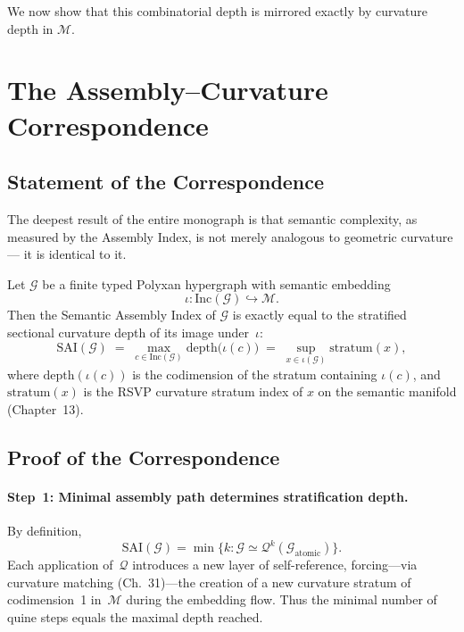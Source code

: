 We now show that this combinatorial depth is mirrored exactly by
curvature depth in $\mathcal{M}$.



\section{The Assembly--Curvature Correspondence}
\label{sec:assembly-curvature}

\subsection{Statement of the Correspondence}

The deepest result of the entire monograph is that semantic complexity, as
measured by the Assembly Index, is not merely analogous to geometric curvature
--- it is identical to it.

\begin{theorem}
\label{thm:assembly-curvature}
Let $\mathcal{G}$ be a finite typed Polyxan hypergraph with semantic embedding
\[
\iota : \mathrm{Inc}(\mathcal{G}) \hookrightarrow \mathcal{M}.
\]
Then the Semantic Assembly Index of $\mathcal{G}$ is exactly equal to the
stratified sectional curvature depth of its image under~$\iota$:
\begin{equation}
\mathrm{SAI}(\mathcal{G})
  \;=\;
\max_{c\in\mathrm{Inc}(\mathcal{G})} \mathrm{depth}\bigl(\iota(c)\bigr)
  \;=\;
\sup_{x\in\iota(\mathcal{G})} \mathrm{stratum}(x),
\end{equation}
where $\mathrm{depth}(\iota(c))$ is the codimension of the stratum containing
$\iota(c)$, and $\mathrm{stratum}(x)$ is the RSVP curvature stratum index of
$x$ on the semantic manifold (Chapter~13).
\end{theorem}


\subsection{Proof of the Correspondence}

\paragraph{Step~1: Minimal assembly path determines stratification depth.}
By definition,
\[
\mathrm{SAI}(\mathcal{G})
  = \min\{k : \mathcal{G} \simeq\mathcal{Q}^k(\mathcal{G}_{\mathrm{atomic}})\}.
\]
Each application of~$\mathcal{Q}$ introduces a new layer of self-reference,
forcing---via curvature matching (Ch.~31)---the creation of a new
curvature stratum of codimension~1 in~$\mathcal{M}$ during the embedding flow.
Thus the minimal number of quine steps equals the maximal depth reached.


